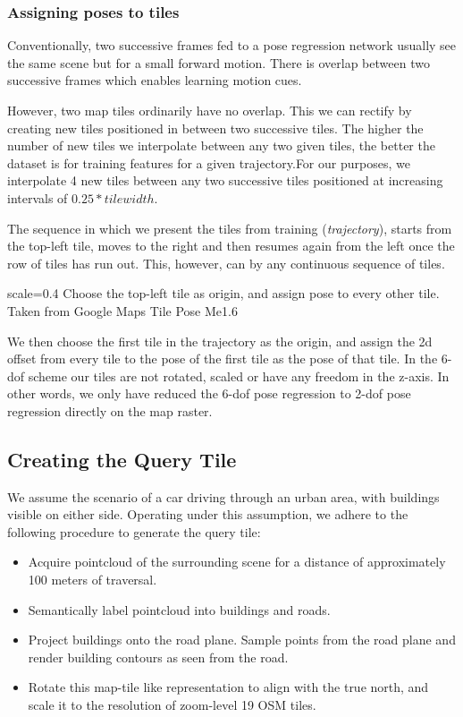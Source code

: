 \subsubsection{Assigning poses to tiles}
Conventionally, two successive frames fed to a pose regression network usually see the same scene but for a small forward motion. There is overlap between two successive frames which enables learning motion cues. 

However, two map tiles ordinarily have no overlap. This we can rectify by creating new tiles positioned in between two successive tiles. The higher the number of new tiles we interpolate between any two given tiles, the better the dataset is for training features for a given trajectory.For our purposes, we interpolate 4 new tiles between any two successive tiles positioned at increasing intervals of $0.25 * tilewidth$. 

The sequence in which we present the tiles from training (\textit{trajectory}), starts from the top-left tile, moves to the right and then resumes again from the left once the row of tiles has run out. This, however, can by any continuous sequence of tiles.

{scale=0.4}%
{Choose the top-left tile as origin, and assign pose to every other tile. Taken from Google Maps}%
{Tile Pose}%
{Me1.6}

We then choose the first tile in the trajectory as the origin, and assign the 2d offset from every tile to the pose of the first tile as the pose of that tile. In the 6-dof scheme our tiles are not rotated, scaled or have any freedom in the z-axis. In other words, we only have reduced the 6-dof pose regression to 2-dof pose regression directly on the map raster. 

\subsection{Creating the Query Tile}
We assume the scenario of a car driving through an urban area, with buildings visible on either side. Operating under this assumption, we adhere to the following procedure to generate the query tile:

\begin{itemize}
	\item Acquire pointcloud of the surrounding scene for a distance of approximately 100 meters of traversal.\\
	\item Semantically label pointcloud into buildings and roads.\\
	\item Project buildings onto the road plane. Sample points from the road plane and render building contours as seen from the road. \\
	\item Rotate this map-tile like representation to align with the true north, and scale it to the resolution of zoom-level 19 OSM tiles.
\end{itemize}

